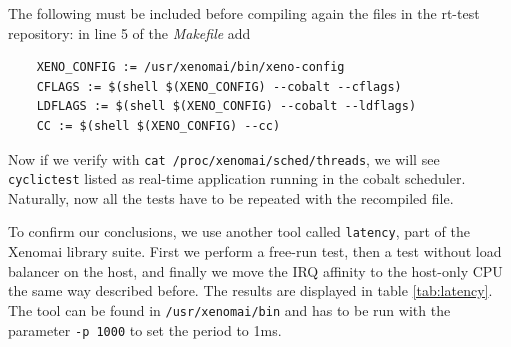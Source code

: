 \documentclass[]{scrartcl}
\begin{document}
The following must be included before compiling again the files in the rt-test repository: in line 5 of the \textit{Makefile} add

\begin{verbatim}
	XENO_CONFIG := /usr/xenomai/bin/xeno-config
	CFLAGS := $(shell $(XENO_CONFIG) --cobalt --cflags)
	LDFLAGS := $(shell $(XENO_CONFIG) --cobalt --ldflags)
	CC := $(shell $(XENO_CONFIG) --cc)
\end{verbatim}

Now if we verify with \texttt{cat /proc/xenomai/sched/threads}, we will see \texttt{cyclictest} listed as real-time application running in the cobalt scheduler.
Naturally, now all the tests have to be repeated with the recompiled file.


To confirm our conclusions, we use another tool called \texttt{latency}, part of the Xenomai library suite. First we perform a free-run test, then a test without load balancer on the host, and finally we move the IRQ affinity to the host-only CPU the same way described before. The results are displayed in table \ref{tab:latency}. The tool can be found in \texttt{/usr/xenomai/bin} and has to be run with the parameter \texttt{-p 1000} to set the period to 1ms.
\end{document}

